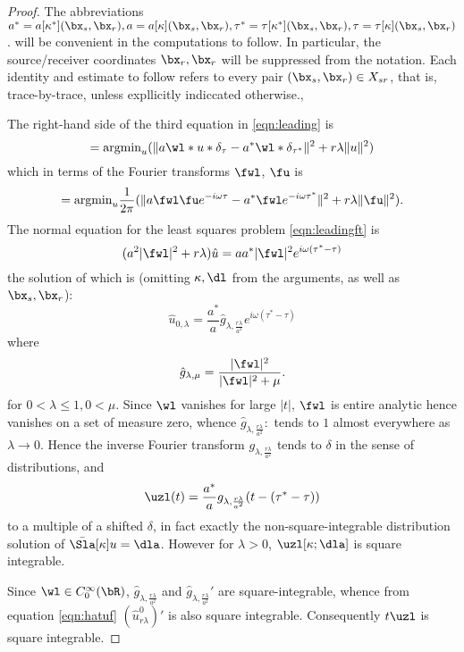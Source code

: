 \begin{proof}
  The abbreviations
  $a^*=a[\kappa^*](\bx_s,\bx_r), a=a[\kappa](\bx_s,\bx_r),
  \tau^*=\tau[\kappa^*](\bx_s,\bx_r), \tau=\tau[\kappa](\bx_s,\bx_r)$.
  will be convenient in the computations to follow. In particular, the
  source/receiver coordinates $\bx_r,\bx_r$ will be suppressed from
  the notation. Each identity and estimate to follow refers to every
  pair $(\bx_s,\bx_r) \in X_{sr}$, that is, trace-by-trace, unless
  expllicitly indiccated otherwise.,

The right-hand side of the third equation in \ref{eqn:leading} is 
\[
= \mbox{argmin}_u (\|a \wl*u*\delta_{\tau}-a^*\wl*\delta_{\tau^*}\|^2 + r\lambda\|u\|^2)
\]
which in terms of the Fourier transforms $\fwl$, $\fu$ is
\begin{equation}
  \label{eqn:leadingft}
= \mbox{argmin}_u \frac{1}{2\pi}(\|a \fwl \fu e^{-i\omega \tau}-a^*\fwl e^{-i\omega \tau^*}\|^2 + r\lambda\|\fu\|^2).
\end{equation}
The normal equation for the least squares problem \ref{eqn:leadingft} is
\[
(a^2 |\fwl|^2 +r\lambda)\hat{u} = a a^*|\fwl|^2e^{i\omega(\tau^*-\tau)}
\]
the solution of which is (omitting $\kappa, \dl$ from the arguments,
as well as $\bx_s,\bx_r$):
\begin{equation}
  \label{eqn:hatuf}
\hat{u}_{0,\lambda} = \frac{a^*}{a}\hat{g}_{\lambda,\frac{r\lambda}{a^2}} e^{i\omega(\tau^*-\tau)}
\end{equation}
where
\begin{equation}
  \label{eqn:hatgf}
\hat{g}_{\lambda,\mu} = \frac{|\fwl|^2}{|\fwl|^2 + \mu}.
\end{equation}
for $0 < \lambda \le 1, 0 < \mu$. Since $\wl$ vanishes for large $|t|$, $\fwl$ is entire analytic hence
vanishes on a set of measure zero, whence $\hat{g}_{\lambda,\frac{r\lambda}{a^2}}:$
tends to $1$ almost everywhere as $\lambda \rightarrow 0$. Hence the
inverse Fourier transform $g_{\lambda,\frac{r\lambda}{a^2}}$ tends to $\delta$ in
the sense of distributions, and
\begin{equation}
  \label{eqn:u0s}
\uzl(t) = \frac{a^*}{a}g_{\lambda,\frac{r\lambda}{a^2}}(t-(\tau^*-\tau))
\end{equation}
to a multiple of a shifted $\delta$, in fact exactly the
non-square-integrable distribution
solution of $\bar{\Sla}[\kappa]u=\dla$. However for $\lambda>0$, $\uzl[\kappa;\dla]$ is square integrable.

Since $\wl \in C_0^{\infty}(\bR)$, $\hat{g}_{\lambda,\frac{r\lambda}{a^2}}$
and $\hat{g}_{\lambda,\frac{r\lambda}{a^2}}'$ are square-integrable, whence
from equation \ref{eqn:hatuf} $(\hat{u}^0_{r\lambda})'$ is also square
integrable. Consequently $t \uzl$ is square integrable.


\end{proof}
